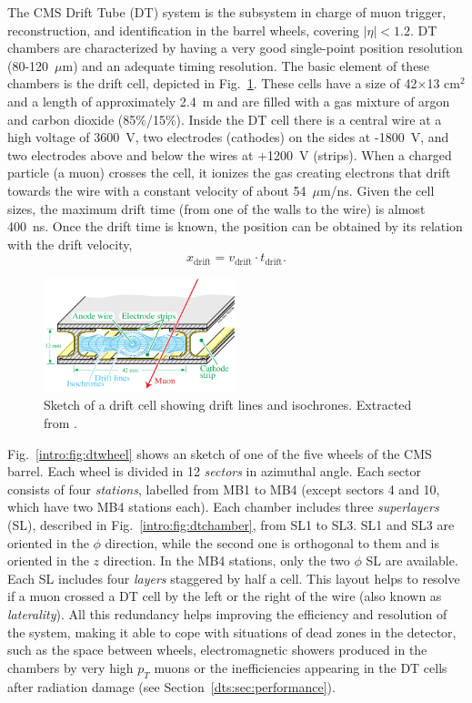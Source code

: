 \documentclass[../main.tex]{subfiles}
\begin{document}
The CMS Drift Tube (DT) system is the subsystem in charge of muon trigger, reconstruction, and identification in the barrel wheels, covering $|\eta|<1.2$. DT chambers are characterized by having a very good single-point position resolution (80-120~$\mu$m) and an adequate timing resolution. The basic element of these chambers is the drift cell, depicted in Fig.~\ref{intro:fig:dtcell}. These cells have a size of 42$\times$13 cm${}^2$ and a length of approximately 2.4~m and are filled with a gas mixture of argon and carbon dioxide (85\%/15\%). Inside the DT cell there is a central wire at a high voltage of 3600~V, two electrodes (cathodes) on the sides at -1800~V, and two electrodes above and below the wires at +1200~V (strips). When a charged particle (a muon) crosses the cell, it ionizes the gas creating electrons that drift towards the wire with a constant velocity of about 54~$\mu$m/ns. Given the cell sizes, the maximum drift time (from one of the walls to the wire) is almost 400~ns. Once the drift time is known, the position can be obtained by its relation with the drift velocity,
\begin{equation}
x_\text{drift} = v_\text{drift}\cdot t_\text{drift}.
\end{equation}

\begin{figure}
\begin{center}
\includegraphics[width=0.5\textwidth]{Images/Celda.png}
\end{center}
\caption[Drift Tube cell]{Sketch of a drift cell showing drift lines and isochrones. Extracted from \cite{intro:exp:cms}.}
\label{intro:fig:dtcell}
\end{figure}

Fig.~\ref{intro:fig:dtwheel} shows an sketch of one of the five wheels of the CMS barrel. Each wheel is divided in 12 \textit{sectors} in azimuthal angle. Each sector consists of four \textit{stations}, labelled from MB1 to MB4 (except sectors 4 and 10, which have two MB4 stations each). Each chamber includes three \textit{superlayers} (SL), described in Fig.~\ref{intro:fig:dtchamber}, from SL1 to SL3. SL1 and SL3 are oriented in the $\phi$ direction, while the second one is orthogonal to them and is oriented in the $z$ direction. In the MB4 stations, only the two $\phi$ SL are available. Each SL includes four \textit{layers} staggered by half a cell. This layout helps to resolve if a muon crossed a DT cell by the left or the right of the wire (also known as \textit{laterality}). All this redundancy helps improving the efficiency and resolution of the system, making it able to cope with situations of dead zones in the detector, such as the space between wheels, electromagnetic showers produced in the chambers by very high $p_T$ muons or the inefficiencies appearing in the DT cells after radiation damage (see Section~\ref{dts:sec:performance}).
\end{document}
